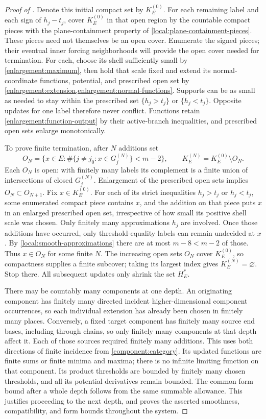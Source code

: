 \begin{proof}[Proof of ]
Denote this initial compact set by $K_E^{(0)}$.  For each remaining
label and each sign of $h_j-t_j$, cover $K_E^{(0)}$ in that open
region by the countable compact pieces with the plane-containment property of \cref{local:plane-containment-pieces}.
These pieces need not themselves be an open cover.  Enumerate the
signed pieces; their eventual inner forcing neighborhoods will provide
the open cover needed for termination.  For each,
choose its shell sufficiently small by \cref{enlargement:maximum}, then
hold that scale fixed and extend its normal-coordinate functions, potential, and prescribed open set by
\cref{enlargement:extension,enlargement:normal-functions}.  Supports can be as small as needed
to stay within the prescribed set $\{h_j>t_j\}$ or $\{h_j<t_j\}$.  Opposite updates
for one label therefore never conflict.  Functions retain
\cref{enlargement:function-output} by their active-branch inequalities, and
prescribed open sets enlarge monotonically.

To prove finite termination, after $N$ additions set
\[
 O_N=\{x\in E:\#\{j\ne j_0:x\in G_j^{(N)}\}<m-2\},
 \qquad K_E^{(N)}=K_E^{(0)}\setminus O_N.
\]
Each $O_N$ is open: with finitely many labels its complement is a
finite union of intersections of closed $G_j^{(N)}$.  Enlargement of the prescribed open sets
implies $O_N\subset O_{N+1}$.  Fix $x\in K_E^{(0)}$.  For each of its
strict inequalities $h_j>t_j$ or $h_j<t_j$, some enumerated compact piece contains $x$, and the
addition on that piece puts $x$ in an enlarged prescribed open set, irrespective
of how small its positive shell scale was chosen.  Only finitely many
approximations $h_j$ are involved.  Once those additions have occurred, only
threshold-equality labels can remain undecided at $x$.  By
\cref{local:smooth-approximations} there are at most $m-8<m-2$ of those.
Thus $x\in O_N$ for some finite $N$.  The increasing open sets $O_N$
cover $K_E^{(0)}$, so compactness supplies a finite subcover; taking
its largest index gives $K_E^{(N)}=\varnothing$.  Stop there.
All subsequent updates only shrink the set $H_E^*$.

There may be countably many components at one depth.  An originating component
has finitely many directed incident higher-dimensional component occurrences, so each individual
extension has already been chosen in finitely many places.  Conversely,
a fixed target component has finitely many source end bases, including through
chains, so only finitely many components at that depth affect it.  Each of
those sources required finitely many additions.  This uses both
directions of finite incidence from \cref{component:category}.
Its updated functions are finite sums or finite minima and maxima;
there is no infinite limiting function on that component.  Its product
thresholds are bounded by finitely many chosen thresholds, and all its
potential derivatives remain bounded.  The common form bound after a
whole depth follows from the same summable allowance.  This justifies
proceeding to the next depth, and proves the asserted smoothness,
compatibility, and form bounds throughout the system.


\end{proof}
